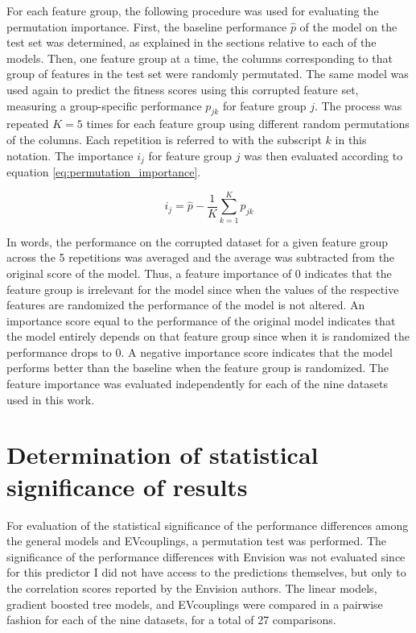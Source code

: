 For each feature group, the following procedure was used for evaluating the permutation importance.
First, the baseline performance $\hat{p}$ of the model on the test set was determined, as explained in the sections relative to each of the models.
Then, one feature group at a time, the columns corresponding to that group of features in the test set were randomly permutated.
The same model was used again to predict the fitness scores using this corrupted feature set, measuring a group-specific performance $p_{jk}$ for feature group $j$.
The process was repeated $K=5$ times for each feature group using different random permutations of the columns.
Each repetition is referred to with the subscript $k$ in this notation.
The importance $i_j$ for feature group $j$ was then evaluated according to equation \cref{eq:permutation_importance}.

\begin{equation}\label{eq:permutation_importance}
	i_j = \hat{p} - \frac{1}{K} \sum_{k=1}^K p_{jk}
\end{equation}

In words, the performance on the corrupted dataset for a given feature group across the \num{5} repetitions was averaged and the average was subtracted from the original score of the model.
Thus, a feature importance of \num{0} indicates that the feature group is irrelevant for the model since when the values of the respective features are randomized the performance of the model is not altered.
An importance score equal to the performance of the original model indicates that the model entirely depends on that feature group since when it is randomized the performance drops to \num{0}.
A negative importance score indicates that the model performs better than the baseline when the feature group is randomized.
The feature importance was evaluated independently for each of the nine datasets used in this work.

\section{Determination of statistical significance of results}\label{mm:significance}
For evaluation of the statistical significance of the performance differences among the general models and EVcouplings, a permutation test was performed.
The significance of the performance differences with Envision was not evaluated since for this predictor I did not have access to the predictions themselves, but only to the correlation scores reported by the Envision authors.
The linear models, gradient boosted tree models, and EVcouplings were compared in a pairwise fashion for each of the nine datasets, for a total of \num{27} comparisons.

